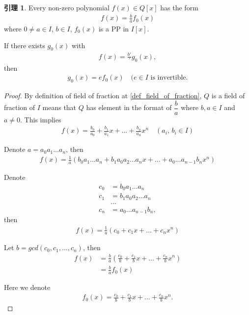 \documentclass[utf8]{ctexbook}
\theoremstyle{definition}
\newtheorem{lemma}{引理}[section]
\begin{document}
\begin{lemma}
\label{lemma_Factor_poly_ring_2}
Every non-zero polynomial $f(x) \in Q[x]$ has the form
\begin{align}
f(x) = \frac{b}{a} f_0 (x)
\end{align}
where $0 \neq a \in I$, $b \in I$, $f_0 (x)$ is a PP in $I[x]$.

If there exists $g_0 (x)$ with
\begin{align*}
f(x) = \frac{b'}{'} g_0 (x),
\end{align*}
then
\begin{align*}
g_0 (x) = e f_0 (x) \quad (e \in I \mbox{ is invertible} .
\end{align*}
\end{lemma}

\begin{proof}
By definition of field of fraction at \ref{def_field_of_fraction}, $Q$ is a field of fraction of $I$ means that $Q$ has element in the format of $\dfrac{b}{a}$ where $b, a \in I$ and $a \neq 0$. This implies
\begin{align*}
f(x) = \frac{b_0}{a_0} + \frac{b_1}{a_1} x + \ldots + \frac{b_n}{a_n} x^n \quad (a_i, \, b_i \in I)
\end{align*}

Denote $a = a_0 a_1 \ldots a_n$, then
\begin{align*}
f(x) = \frac{1}{a} (b_0 a_1 \ldots a_n + b_1 a_0 a_2 \ldots a_n x + \ldots + a_0 \ldots a_{n-1} b_n x^n)
\end{align*}

Denote
\begin{align*}
c_0 &= b_0 a_1 \ldots a_n\\
c_1 &= b_1 a_0 a_2 \ldots a_n \\
& \ldots \\
c_n &= a_0 \ldots a_{n-1} b_n ,
\end{align*}
then
\begin{align*}
f(x) = \frac{1}{a} (c_0 + c_1 x + \ldots + c_n x^n )
\end{align*}

Let $b = gcd(c_0, c_1, \ldots , c_n)$, then
\begin{align*}
f(x) &= \frac{b}{a} ( \frac{c_0}{b} + \frac{c_1}{b} x + \ldots + \frac{c_n}{b} x^n )\\
&= \frac{b}{a} f_0 (x)
\end{align*}

Here we denote
\begin{align*}
f_0 (x) = \frac{c_0}{b} + \frac{c_1}{b} x + \ldots + \frac{c_n}{b} x^n .
\end{align*}


\end{proof}
\end{document}
